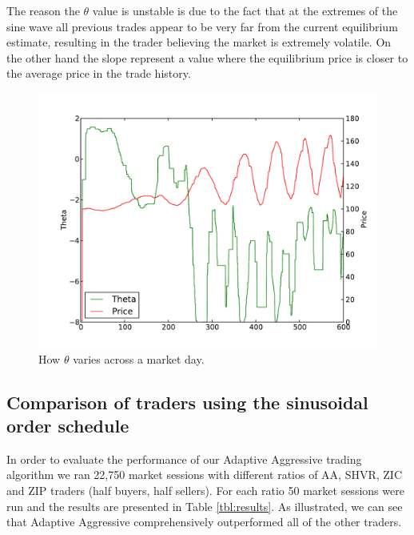 \documentclass[preprint]{acm_proc_article-sp} %
\begin{document}
The reason the $\theta$ value is unstable is due to the fact that at the
extremes of the sine wave all previous trades appear to be very far from the
current equilibrium estimate, resulting in the trader believing the market is
extremely volatile. On the other hand the slope represent a value where the
equilibrium price is closer to the average price in the trade history.
\begin{figure}[H]
  \centering
  \includegraphics[width=\columnwidth]{graphs_and_stats/graph_theta_vs_time.pdf}
  \caption{How $\theta$ varies across a market day.}
  \label{fig:theta_v_time}
\end{figure}

\subsection{Comparison of traders using the sinusoidal order schedule}
\label{sec:eval_schedule}
In order to evaluate the performance of our Adaptive Aggressive trading
algorithm we ran 22,750 market sessions with different ratios of AA, SHVR, ZIC
and ZIP traders (half buyers, half sellers). For each ratio 50 market sessions
were run and the results are presented in Table \ref{tbl:results}. As
illustrated, we can see that Adaptive Aggressive comprehensively outperformed all of the other
traders.
\end{document}
